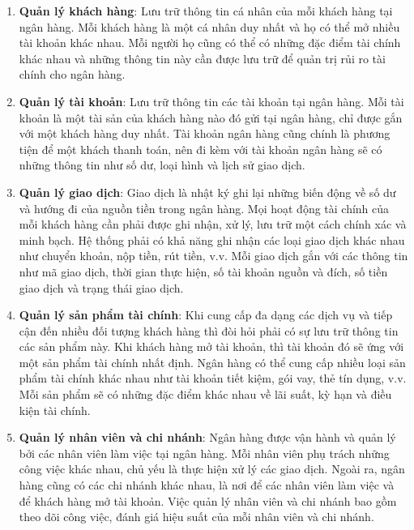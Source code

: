 \documentclass[a4paper, 12pt]{report}
\begin{document}
\begin{enumerate}[leftmargin=2cm]

    \item \textbf{Quản lý khách hàng}: Lưu trữ thông tin cá nhân của mỗi khách hàng tại ngân hàng.
    Mỗi khách hàng là một cá nhân duy nhất và họ có thể mở nhiều tài khoản khác nhau.
    Mỗi người họ cũng có thể có những đặc điểm tài chính khác nhau và những thông tin này cần được lưu trữ để quản trị rủi ro tài chính cho ngân hàng.
    
    \item \textbf{Quản lý tài khoản}: Lưu trữ thông tin các tài khoản tại ngân hàng.
    Mỗi tài khoản là một tài sản của khách hàng nào đó gửi tại ngân hàng, chỉ được gắn với một khách hàng duy nhất.
    Tài khoản ngân hàng cũng chính là phương tiện để một khách thanh toán, nên đi kèm với tài khoản ngân hàng sẽ có những thông tin như số dư, loại hình và lịch sử giao dịch.
    
    \item \textbf{Quản lý giao dịch}: Giao dịch là nhật ký ghi lại những biến động về số dư và hướng đi của nguồn tiền trong ngân hàng.
    Mọi hoạt động tài chính của mỗi khách hàng cần phải được ghi nhận, xử lý, lưu trữ một cách chính xác và minh bạch.
    Hệ thống phải có khả năng ghi nhận các loại giao dịch khác nhau như chuyển khoản, nộp tiền, rút tiền, v.v.
    Mỗi giao dịch gắn với các thông tin như mã giao dịch, thời gian thực hiện, số tài khoản nguồn và đích, số tiền giao dịch và trạng thái giao dịch.
    
    \item \textbf{Quản lý sản phẩm tài chính}: Khi cung cấp đa dạng các dịch vụ và tiếp cận đến nhiều đối tượng khách hàng thì đòi hỏi phải có sự lưu trữ thông tin các sản phẩm này.
    Khi khách hàng mở tài khoản, thì tài khoản đó sẽ ứng với một sản phẩm tài chính nhất định.
    Ngân hàng có thể cung cấp nhiều loại sản phẩm tài chính khác nhau như tài khoản tiết kiệm, gói vay, thẻ tín dụng, v.v.
    Mỗi sản phẩm sẽ có những đặc điểm khác nhau về lãi suất, kỳ hạn và điều kiện tài chính.
    
    \item \textbf{Quản lý nhân viên và chi nhánh}: Ngân hàng được vận hành và quản lý bởi các nhân viên làm việc tại ngân hàng.
    Mỗi nhân viên phụ trách những công việc khác nhau, chủ yếu là thực hiện xử lý các giao dịch.
    Ngoài ra, ngân hàng cũng có các chi nhánh khác nhau, là nơi để các nhân viên làm việc và để khách hàng mở tài khoản.
    Việc quản lý nhân viên và chi nhánh bao gồm theo dõi công việc, đánh giá hiệu suất của mỗi nhân viên và chi nhánh.

    
\end{enumerate}
\end{document}

